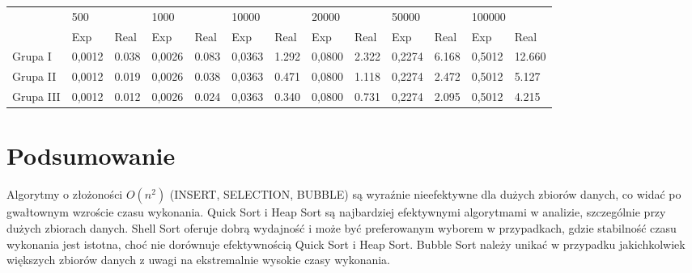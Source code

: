 \documentclass{article}
\begin{document}
\begin{table}[H]
    \begin{tabular}{lrlrlrlrlrlrl}
                       & \multicolumn{2}{l}{500}         & \multicolumn{2}{l}{1000}        & \multicolumn{2}{l}{10000}              & \multicolumn{2}{l}{20000}       & \multicolumn{2}{l}{50000}       & \multicolumn{2}{l}{100000}       \\
    \multirow{-2}{*}{} & \multicolumn{1}{l}{Exp} & Real  & \multicolumn{1}{l}{Exp} & Real  & \multicolumn{1}{l}{Exp}        & Real  & \multicolumn{1}{l}{Exp} & Real  & \multicolumn{1}{l}{Exp} & Real  & \multicolumn{1}{l}{Exp} & Real   \\
    Grupa I            & 0,0012                  & 0.038 & 0,0026                  & 0.083 & 0,0363 & 1.292 & 0,0800                  & 2.322 & 0,2274                  & 6.168 & 0,5012                  & 12.660 \\
    Grupa II           & 0,0012                  & 0.019 & 0,0026                  & 0.038 & 0,0363 & 0.471 & 0,0800                  & 1.118 & 0,2274                  & 2.472 & 0,5012                  & 5.127  \\
    Grupa III          & 0,0012                  & 0.012 & 0,0026                  & 0.024 & 0,0363 & 0.340 & 0,0800                  & 0.731 & 0,2274                  & 2.095 & 0,5012                  & 4.215 
    \end{tabular}
    \end{table}
\section*{Podsumowanie}


Algorytmy o złożoności $O(n^2)$ (INSERT, SELECTION, BUBBLE) są wyraźnie nieefektywne dla dużych zbiorów danych, co widać po gwałtownym wzroście czasu wykonania. \newline
Quick Sort i Heap Sort są najbardziej efektywnymi algorytmami w analizie, szczególnie przy dużych zbiorach danych. \newline
Shell Sort oferuje dobrą wydajność i może być preferowanym wyborem w przypadkach, gdzie stabilność czasu wykonania jest istotna, choć nie dorównuje efektywnością Quick Sort i Heap Sort. \newline
Bubble Sort należy unikać w przypadku jakichkolwiek większych zbiorów danych z uwagi na ekstremalnie wysokie czasy wykonania. \newline
\end{document}
